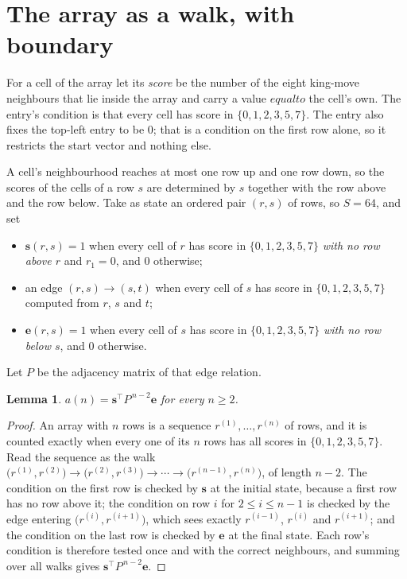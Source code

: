 \documentclass[11pt,a4paper]{article}
\theoremstyle{plain}
\newtheorem{lemma}[theorem]{Lemma}
\theoremstyle{definition}
\begin{document}
\section{The array as a walk, with boundary}

For a cell of the array let its \emph{score} be the number of the eight king-move neighbours that lie inside
the array and carry a value $equal to$ the cell's own. The entry's condition is that every cell
has score in $\{0,1,2,3,5,7\}$. The entry also fixes the top-left entry to be $0$; that is a condition on the first row alone, so it restricts the start vector and nothing else.

A cell's neighbourhood reaches at most one row up and one row down, so the scores of the
cells of a row $s$ are determined by $s$ together with the row above and the row below.
Take as state an ordered pair $(r,s)$ of rows, so $S=64$, and set
\begin{itemize}
\item $\mathbf{s}(r,s)=1$ when every cell of $r$ has score in $\{0,1,2,3,5,7\}$ \emph{with no row
above $r$} and $r_1=0$, and $0$ otherwise;
\item an edge $(r,s)\to(s,t)$ when every cell of $s$ has score in $\{0,1,2,3,5,7\}$ computed from
$r$, $s$ and $t$;
\item $\mathbf{e}(r,s)=1$ when every cell of $s$ has score in $\{0,1,2,3,5,7\}$ \emph{with no row
below $s$}, and $0$ otherwise.
\end{itemize}
Let $P$ be the adjacency matrix of that edge relation.

\begin{lemma}\label{lem:walk}
$a(n)=\mathbf{s}^{\!\top}P^{\,n-2}\mathbf{e}$ for every $n\ge2$.
\end{lemma}

\begin{proof}
An array with $n$ rows is a sequence $r^{(1)},\dots,r^{(n)}$ of rows, and it is counted
exactly when every one of its $n$ rows has all scores in $\{0,1,2,3,5,7\}$. Read the sequence as the
walk $\bigl(r^{(1)},r^{(2)}\bigr)\to\bigl(r^{(2)},r^{(3)}\bigr)\to\cdots\to
\bigl(r^{(n-1)},r^{(n)}\bigr)$, of length $n-2$. The condition on the first row is
checked by $\mathbf{s}$ at the initial state, because a first row has no row above it; the
condition on row $i$ for $2\le i\le n-1$ is checked by the edge entering
$\bigl(r^{(i)},r^{(i+1)}\bigr)$, which sees exactly $r^{(i-1)}$, $r^{(i)}$ and
$r^{(i+1)}$; and the condition on the last row is checked by $\mathbf{e}$ at the final
state. Each row's condition is therefore tested once and with the correct neighbours, and
summing over all walks gives $\mathbf{s}^{\!\top}P^{\,n-2}\mathbf{e}$.
\end{proof}
\end{document}
